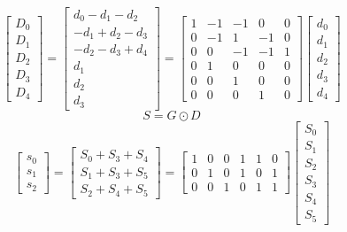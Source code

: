 \documentclass{article}%
\begin{document}
\[%
\left[\begin{matrix}D_{0}\\D_{1}\\D_{2}\\D_{3}\\D_{4}\end{matrix}\right] = \left[\begin{matrix}d_{0} - d_{1} - d_{2}\\- d_{1} + d_{2} - d_{3}\\- d_{2} - d_{3} + d_{4}\\d_{1}\\d_{2}\\d_{3}\end{matrix}\right] = \left[\begin{matrix}1 & -1 & -1 & 0 & 0\\0 & -1 & 1 & -1 & 0\\0 & 0 & -1 & -1 & 1\\0 & 1 & 0 & 0 & 0\\0 & 0 & 1 & 0 & 0\\0 & 0 & 0 & 1 & 0\end{matrix}\right] \left[\begin{matrix}d_{0}\\d_{1}\\d_{2}\\d_{3}\\d_{4}\end{matrix}\right]%
\]%
\[%
S = G \odot D%
\]%
\[%
\left[\begin{matrix}s_{0}\\s_{1}\\s_{2}\end{matrix}\right] = \left[\begin{matrix}S_{0} + S_{3} + S_{4}\\S_{1} + S_{3} + S_{5}\\S_{2} + S_{4} + S_{5}\end{matrix}\right] = \left[\begin{matrix}1 & 0 & 0 & 1 & 1 & 0\\0 & 1 & 0 & 1 & 0 & 1\\0 & 0 & 1 & 0 & 1 & 1\end{matrix}\right] \left[\begin{matrix}S_{0}\\S_{1}\\S_{2}\\S_{3}\\S_{4}\\S_{5}\end{matrix}\right]%
\]%
\end{document}
